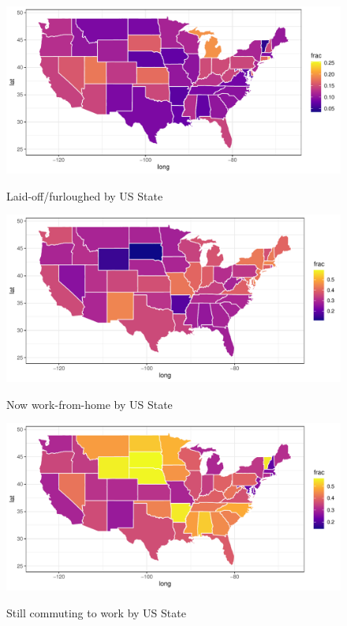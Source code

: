 \documentclass[12pt]{article}
\begin{document}
\begin{figure}
  \caption{Laid-off/furloughed by US State} \label{fig:gender}
\centering
\begin{minipage}{1.0 \linewidth}
  \includegraphics[width = \linewidth]{plots/geo_laidoff.pdf} \\
  \begin{footnotesize}
    \end{footnotesize}
\end{minipage}
\end{figure} 


\begin{figure}
  \caption{Now work-from-home by US State} \label{fig:wfh}
\centering
\begin{minipage}{1.0 \linewidth}
  \includegraphics[width = \linewidth]{plots/geo_wfh.pdf} \\
  \begin{footnotesize}
    \end{footnotesize}
\end{minipage}
\end{figure} 

\begin{figure}
  \caption{Still commuting to work by US State} \label{fig:geo_still_commuting}
\centering
\begin{minipage}{1.0 \linewidth}
  \includegraphics[width = \linewidth]{plots/geo_still_commuting.pdf} \\
  \begin{footnotesize}
    \end{footnotesize}
\end{minipage}
\end{figure} 
\end{document}
